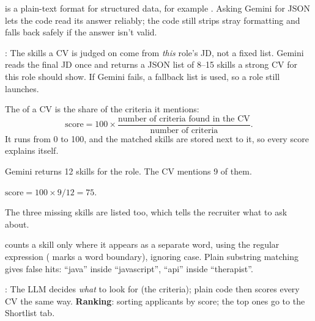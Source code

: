 \begin{definition}[JSON]
 is a plain-text format for structured data, for example . Asking Gemini for JSON lets the code read its answer reliably; the code still strips stray formatting and falls back safely if the answer isn't valid.
\end{definition}

\begin{definition}
: The skills a CV is judged on come from \emph{this} role's JD, not a fixed list. Gemini reads the final JD once and returns a JSON list of 8--15 skills a strong CV for this role should show. If Gemini fails, a fallback list is used, so a role still launches.
\end{definition}

\begin{definition}
The  of a CV is the share of the criteria it mentions:
\[
\text{score} = 100 \times \frac{\text{number of criteria found in the CV}}{\text{number of criteria}} .
\]
It runs from 0 to 100, and the matched skills are stored next to it, so every score explains itself.
\end{definition}

\begin{example}
Gemini returns 12 skills for the role. The CV mentions 9 of them.
\begin{steps}
  \item $\text{score} = 100 \times 9/12 = 75$.
  \item The three missing skills are listed too, which tells the recruiter what to ask about.
\end{steps}
\end{example}

\begin{definition}
 counts a skill only where it appears as a separate word, using the regular expression  ( marks a word boundary), ignoring case. Plain substring matching gives false hits: ``java'' inside ``javascript'', ``api'' inside ``therapist''.
\end{definition}

\begin{definition}
: The LLM decides \emph{what} to look for (the criteria); plain code then scores every CV the same way. \textbf{Ranking}: sorting applicants by score; the top ones go to the Shortlist tab.
\end{definition}

